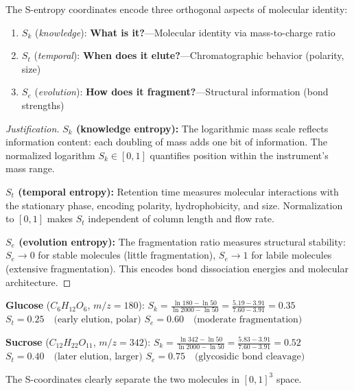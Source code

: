 \begin{proposition}
\label{prop:sphysical}
The S-entropy coordinates encode three orthogonal aspects of molecular identity:
\begin{enumerate}
    \item $S_k$ (\emph{knowledge}): \textbf{What is it?}—Molecular identity via mass-to-charge ratio
    \item $S_t$ (\emph{temporal}): \textbf{When does it elute?}—Chromatographic behavior (polarity, size)
    \item $S_e$ (\emph{evolution}): \textbf{How does it fragment?}—Structural information (bond strengths)
\end{enumerate}
\end{proposition}

\begin{proof}[Justification]
\textbf{$S_k$ (knowledge entropy):} The logarithmic mass scale reflects information content: each doubling of mass adds one bit of information. The normalized logarithm $S_k \in [0,1]$ quantifies position within the instrument's mass range.

\textbf{$S_t$ (temporal entropy):} Retention time measures molecular interactions with the stationary phase, encoding polarity, hydrophobicity, and size. Normalization to $[0,1]$ makes $S_t$ independent of column length and flow rate.

\textbf{$S_e$ (evolution entropy):} The fragmentation ratio measures structural stability: $S_e \to 0$ for stable molecules (little fragmentation), $S_e \to 1$ for labile molecules (extensive fragmentation). This encodes bond dissociation energies and molecular architecture.
\end{proof}

\begin{example}
\label{ex:glucose_sucrose}
\textbf{Glucose} ($C_6H_{12}O_6$, $m/z = 180$):
$
S_k = \frac{\ln 180 - \ln 50}{\ln 2000 - \ln 50} = \frac{5.19 - 3.91}{7.60 - 3.91} = 0.35
$
$
S_t = 0.25 \quad \text{(early elution, polar)}
$
$
S_e = 0.60 \quad \text{(moderate fragmentation)}
$

\textbf{Sucrose} ($C_{12}H_{22}O_{11}$, $m/z = 342$):
$
S_k = \frac{\ln 342 - \ln 50}{\ln 2000 - \ln 50} = \frac{5.83 - 3.91}{7.60 - 3.91} = 0.52
$
$
S_t = 0.40 \quad \text{(later elution, larger)}
$
$
S_e = 0.75 \quad \text{(glycosidic bond cleavage)}
$

The S-coordinates clearly separate the two molecules in $[0,1]^3$ space.
\end{example}



